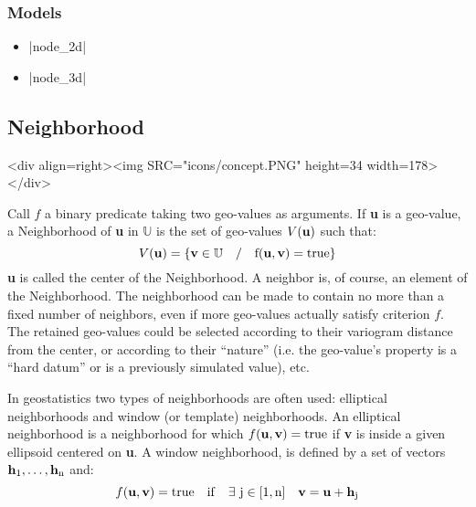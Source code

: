 \documentclass[12pt,twoside]{report}
\newcommand{\gstat}{geostatistics}
\newcommand{\loc}[1]{{\bf #1}}
\newcommand{\mloc}[1]{\rm{\bf #1}}
\newcommand{\SET}[1]{$\mathbb{#1}$}
\newcommand{\MSET}[1]{\mathbb{#1}}
\begin{document}
\htmlrule[CLEAR=all]  \subsubsection*{Models}
\begin{itemize}
\item |node_2d|
\item |node_3d|
\end{itemize}










% 

\subsection{Neighborhood}
\label{concept:neighborhood}
\begin{htmlonly}
<div align=right><img SRC="icons/concept.PNG" height=34 width=178></div>
\end{htmlonly}

Call $f$ a binary predicate taking two geo-values as arguments. If \loc{u} is a geo-value, a Neighborhood of \loc{u} in \SET{U} is the set of geo-values $V(\mloc{u})$ such that:
\begin{displaymath}
  V(\mloc{u})=\{\mloc{v} \in \MSET{U} \quad / \quad f(\mloc{u},\mloc{v})=true\}
\end{displaymath}
\loc{u} is called the center of the Neighborhood. A neighbor is, of course, an element of the Neighborhood. 
The neighborhood can be made to contain no more than a fixed number of neighbors, even if more geo-values actually satisfy criterion $f$. The retained geo-values could be selected according to their variogram distance from the center, or according to their ``nature'' (i.e. the geo-value's property is a ``hard datum'' or is a previously simulated value), etc.

In \gstat{} two types of neighborhoods are often used: elliptical neighborhoods and window (or template) neighborhoods. An elliptical neighborhood is a neighborhood for which \mbox{$f(\mloc{u},\mloc{v})=true$} if \loc{v} is inside a given ellipsoid centered on \loc{u}. A window neighborhood, is defined by a set of vectors \mbox{$\mloc{h}_1,\ldots,\mloc{h}_n$} and:
\begin{displaymath}
  f(\mloc{u},\mloc{v})=true \quad \rm{if } \quad \exists \ j \in [1,n] \quad \mloc{v} = \mloc{u}+\mloc{h}_j
\end{displaymath}
\end{document}
